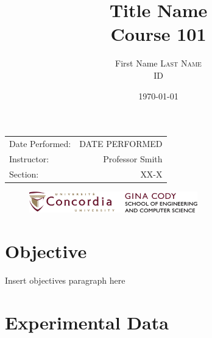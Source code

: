 \documentclass{article}
\title{Title Name \\ Course 101} %
\author{First Name \textsc{Last Name} \\ ID} %
\date{\today} %
\begin{document}
\begin{titlepage}
	\nointerlineskip  %
	\null  %
	\vfill
	\let\snewpage \newpage
	\let\newpage \relax
	\maketitle
	\begin{center}
		\begin{tabular}{l r}
			Date Performed: & DATE PERFORMED \\ %
			Instructor: & Professor Smith \\ %
			Section: & XX-X
		\end{tabular}
	\end{center}
	\let \newpage \snewpage
	\vspace{3in}
	\begin{figure}
		\centering
		\includegraphics[width=0.65\textwidth,scale=1.1]{ENCS.jpg} %
	\end{figure}
	\thispagestyle{empty}
\end{titlepage}






\newpage
\section{Objective}

Insert objectives paragraph here


 

\section{Experimental Data}
\end{document}
